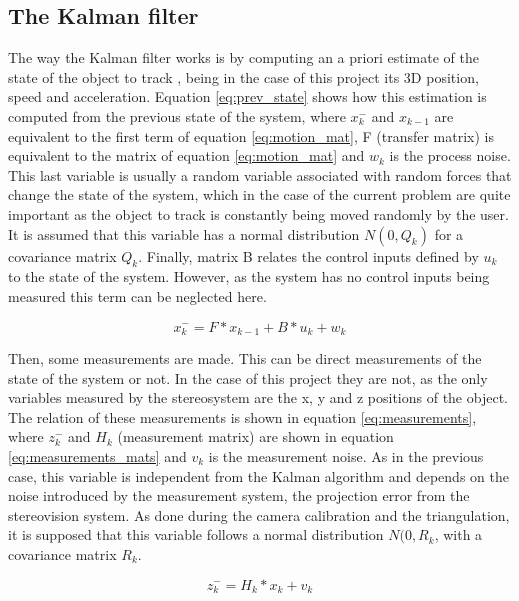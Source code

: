 \subsection{The Kalman filter}
The way the Kalman filter works is by computing an a priori estimate of the state of the object to track \cite{OReilly}, being in the case of this project its 3D position, speed and acceleration. Equation \ref{eq:prev_state} shows how this estimation is computed from the previous state of the system, where $x_{k}^{-}$ and $x_{k-1}$ are equivalent to the first term of equation \ref{eq:motion_mat}, F (transfer matrix) is equivalent to the matrix of equation \ref{eq:motion_mat} and $w_{k}$ is the process noise. This last variable is usually a random variable associated with random forces that change the state of the system, which in the case of the current problem are quite important as the object to track is constantly being moved randomly by the user. It is assumed that this variable has a normal distribution $N(0,Q_{k})$ for a covariance matrix $Q_{k}$.
Finally, matrix B relates the control inputs defined by $u_{k}$ to the state of the system. However, as the system has no control inputs being measured this term can be neglected here.

\begin{equation}
x_{k}^{-}=F*x_{k-1}+B*u_{k}+w_{k}
\label{eq:prev_state}
\end{equation}

Then, some measurements are made. This can be direct measurements of the state of the system or not. In the case of this project they are not, as the only variables measured by the stereosystem are the x, y and z positions of the object. The relation of these measurements is shown in equation \ref{eq:measurements}, where $z_{k}^{-}$ and $H_{k}$ (measurement matrix) are shown in equation \ref{eq:measurements_mats} and $v_{k}$ is the measurement noise. As in the previous case, this variable is independent from the Kalman algorithm and depends on the noise introduced by the measurement system, the projection error from the stereovision system. As done during the camera calibration and the triangulation, it is  supposed that this variable follows a normal distribution $N(0,R_{k}$, with a covariance matrix $R_{k}$.

\begin{equation}
z_{k}^{-}=H_{k}*x_{k}+v_{k}
\label{eq:measurements}
\end{equation}

